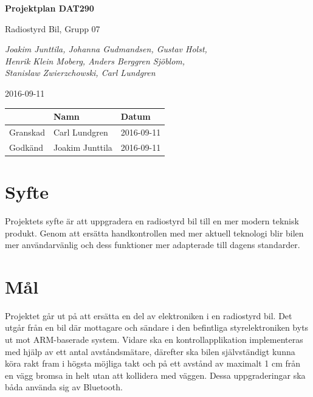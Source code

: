 \documentclass[a4paper]{article}
\begin{document}
\begin{titlepage}
\centering
{\bfseries\huge Projektplan DAT290}

\vspace{10mm}

{\Large Radiostyrd Bil, Grupp 07}

\vspace{20mm}

{\Large \itshape{Joakim Junttila, Johanna Gudmandsen, Gustav Holst,\\Henrik Klein Moberg, Anders Berggren Sjöblom, \\[1mm] Stanislaw Zwierzchowski, Carl Lundgren}}

\vspace{10mm}

{\large 2016-09-11}


\normalsize{
\begin{table}[b]
\centering
\begin{tabular}{|l|l|l|}  \hline
          & \bf Namn & \bf Datum   \\ \hline \hline
 Granskad & Carl Lundgren     & 2016-09-11        \\ \hline
 Godkänd  & Joakim Junttila     & 2016-09-11         \\ \hline
  \end{tabular}  
  \end{table}}

\end{titlepage}
\newpage
\tableofcontents
\newpage


\section{Syfte}
Projektets syfte är att uppgradera en radiostyrd bil till en mer modern teknisk produkt. Genom att ersätta handkontrollen med mer aktuell teknologi blir bilen mer användarvänlig och dess funktioner mer adapterade till dagens standarder.

\section{Mål}
Projektet går ut på att ersätta en del av elektroniken i en radiostyrd bil. Det utgår från en bil där mottagare och sändare i den befintliga styrelektroniken byts ut mot ARM-baserade system. Vidare ska en kontrollapplikation implementeras med hjälp av ett antal avståndsmätare, därefter ska bilen självständigt kunna köra rakt fram i högsta möjliga takt och på ett avstånd av maximalt 1 cm från en vägg bromsa in helt utan att kollidera med väggen. Dessa uppgraderingar ska båda använda sig av Bluetooth. 
\end{document}
